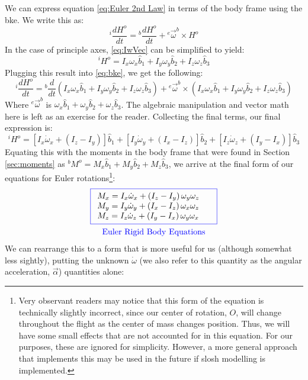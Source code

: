 \documentclass[12pt]{report}
\begin{document}
We can express equation \eqref{eq:Euler 2nd Law} in terms of the body frame using the \gls{bke}. We write this as:
\begin{equation}\label{eq:bke}
{}^i\frac{dH^o}{dt}={}^b\frac{dH^o}{dt}+{}^e\vec{\omega}^b\times H^o
\end{equation}
In the case of principle axes, \eqref{eq:IwVec} can be simplified to yield:
$${}^iH^o=I_x\omega_x\hat{b}_1+I_y\omega_y\hat{b}_2+I_z\omega_z\hat{b}_3$$
Plugging this result into \eqref{eq:bke}, we get the following:
$${}^i\frac{dH^o}{dt}={}^b\frac{d}{dt}\left(I_x\omega_x\hat{b}_1+I_y\omega_y\hat{b}_2+I_z\omega_z\hat{b}_3\right)+{}^e\vec{\omega}^b\times \left(I_x\omega_x\hat{b}_1+I_y\omega_y\hat{b}_2+I_z\omega_z\hat{b}_3\right)$$
Where ${}^e\vec{\omega}^b$ is $\omega_x\hat{b}_1+\omega_y\hat{b}_2+\omega_z\hat{b}_3$. The algebraic manipulation and vector math here is left as an exercise for the reader. Collecting the final terms, our final expression is:
$${}^iH^o=\left[I_x\dot{\omega}_x+\left(I_z-I_y\right)\right]\hat{b}_1+\left[I_y\dot{\omega}_y+\left(I_x-I_z\right)\right]\hat{b}_2+\left[I_z\dot{\omega}_z+\left(I_y-I_x\right)\right]\hat{b}_3$$
Equating this with the moments in the body frame that were found in Section \ref{sec:moments} as ${}^bM^o=M_x\hat{b}_1+M_y\hat{b}_2+M_z\hat{b}_3$, we arrive at the final form of our equations for Euler rotations\footnote{Very observant readers may notice that this form of the equation is technically slightly incorrect, since our center of rotation, $O$, will change throughout the flight as the center of mass changes position. Thus, we will have some small effects that are not accounted for in this equation. For our purposes, these are ignored for simplicity. However, a more general approach that implements this may be used in the future if slosh modelling is implemented.}:
\begin{gather}\label{eq: moment equations}
\color{blue}\boxed{\color{black}\begin{array}{ll}
     M_x=I_x\dot{\omega}_x+\left(I_z-I_y\right)\omega_y\omega_z
     & \\M_y=I_y\dot{\omega}_y+\left(I_x-I_z\right)\omega_x\omega_z\
     &\\ M_z=I_z\dot{\omega}_z+\left(I_y-I_x\right)\omega_y\omega_x
\end{array}}
\\\mathrm{\color{blue}Euler \ Rigid \ Body \ Equations}
\end{gather}
We can rearrange this to a form that is more useful for us (although somewhat less sightly), putting the unknown $\dot\omega$ (we also refer to this quantity as the angular acceleration, $\vec{\alpha}$) quantities alone:
\end{document}
